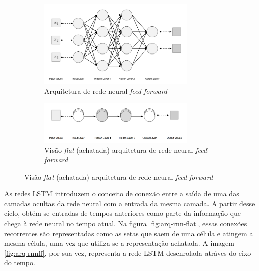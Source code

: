 \begin{figure}[H]
  \centering
  \begin{subfigure}{7.5cm}
      \centering
      \label{fig:arq-ff}
      \includegraphics[width=7.5cm]{../figuras/redes/arq-ff.png}
      \caption{Arquitetura de rede neural \textit{feed forward}}
  \end{subfigure}
  \hfill
  \begin{subfigure}{7.5cm}
      \centering
      \includegraphics[width=7.5cm]{../figuras/redes/arq-ff-flat.png}
      \caption{Visão \textit{flat} (achatada) arquitetura de rede neural \textit{feed forward} }
      \label{fig:arq-ff-flat}
  \end{subfigure}
  \label{fig:comparacao-ff-flat-normal}
\end{figure}

As redes LSTM introduzem o conceito de conexão entre a saída de uma das 
camadas ocultas da rede neural com a entrada da mesma camada. A partir desse
ciclo, obtém-se entradas de tempos anteriores como parte da informação que 
chega à rede neural no tempo atual. Na figura \ref{fig:arq-rnn-flat}, essas 
conexões recorrentes são representadas como as setas que saem de uma célula e 
atingem a mesma célula, uma vez que utiliza-se a representação achatada.
A imagem \ref{fig:arq-rnnff}, por sua vez, representa a rede LSTM desenrolada 
atráves do eixo do tempo.

